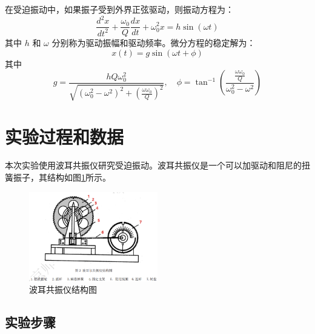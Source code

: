\documentclass[UTF8]{ctexart}
\begin{document}
在受迫振动中，如果振子受到外界正弦驱动，则振动方程为：
\begin{equation}
\frac{d^2 x}{d t^2} + \frac{\omega_0}{Q} \frac{d x}{d t} + \omega_0^2 x = h \sin(\omega t)
\end{equation}
其中 $h$ 和 $\omega$ 分别称为驱动振幅和驱动频率。微分方程的稳定解为：
\begin{equation}
x(t) = g \sin(\omega t + \phi)
\end{equation}
其中
\begin{equation}
g = \frac{hQ \omega_0^2}{\sqrt{(\omega_0^2 - \omega^2)^2 + (\frac{\omega \omega_0}{Q})^2}}, \quad \phi = \tan^{-1}\left(\frac{\frac{\omega \omega_0}{Q}}{\omega_0^2 - \omega^2}\right)
\end{equation}

\section{实验过程和数据}
本次实验使用波耳共振仪研究受迫振动。波耳共振仪是一个可以加驱动和阻尼的扭簧振子，其结构如图\ref{fig:apparatus}所示。

\begin{figure}[H]
    \centering
    \includegraphics[width=0.5\textwidth]{apparatus.png}
    \caption{波耳共振仪结构图}
    \label{fig:apparatus}
\end{figure}

\subsection{实验步骤}
\end{document}
